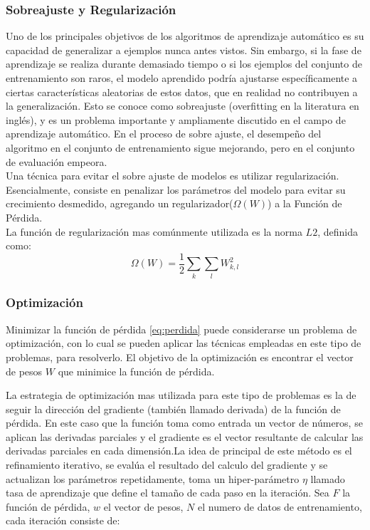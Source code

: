 \documentclass[a4paper,11pt,spanish]{book}
\begin{document}
	\subsubsection {Sobreajuste y Regularización}
	  Uno de los principales objetivos de los algoritmos de aprendizaje automático es su capacidad de generalizar a ejemplos nunca antes vistos. Sin embargo, si la fase
	  de aprendizaje se realiza durante demasiado tiempo o si los ejemplos del conjunto de entrenamiento son raros, el modelo aprendido podría ajustarse específicamente
	  a ciertas características aleatorias de estos datos, que en realidad no contribuyen a la generalización. Esto se conoce como sobreajuste (overfitting en la literatura en inglés),
	  y es un problema importante y ampliamente discutido en el campo de aprendizaje automático. En el proceso de sobre ajuste, el desempeño del algoritmo en el
	  conjunto de entrenamiento sigue mejorando, pero en el conjunto de evaluación empeora.\\
	  Una técnica para evitar el sobre ajuste de modelos es utilizar regularización. Esencialmente, consiste en penalizar los parámetros del modelo para evitar su
	  crecimiento desmedido, agregando un regularizador($\Omega(W)$) a la Función de Pérdida. \\
	  La función de regularización mas comúnmente utilizada es la norma $L2$, definida como:
	   \begin{equation*}
	    \Omega(W) = \frac{1}{2} {\sum_{k} {\sum_{l}} W_{k,l}^2}
	   \end{equation*}
\fi
    \subsubsection{Optimización} \label{sec:optimizacion}
      Minimizar la función de pérdida \eqref{eq:perdida} puede considerarse un problema de optimización, con lo cual se pueden aplicar las técnicas empleadas en este tipo de problemas, para resolverlo.
      El objetivo de la optimización es encontrar el vector de pesos $W$ que minimice la función de pérdida.
      
      La estrategia de optimización mas utilizada para este tipo de problemas es la de seguir la dirección del gradiente (también llamado derivada) de la función de pérdida.
      En este caso que la función toma como entrada un vector de números, se aplican las derivadas parciales y el gradiente es el vector resultante de calcular las derivadas parciales
      en cada dimensión.La idea de principal de este método es el refinamiento iterativo, se evalúa el resultado del calculo del gradiente y se actualizan los parámetros repetidamente,
      toma un hiper-parámetro $\eta$ llamado tasa de aprendizaje que define el tamaño de cada paso en la iteración.
      Sea $F$ la función de pérdida, $w$ el vector de pesos, $N$ el numero de datos de entrenamiento, cada iteración consiste de:
\end{document}
